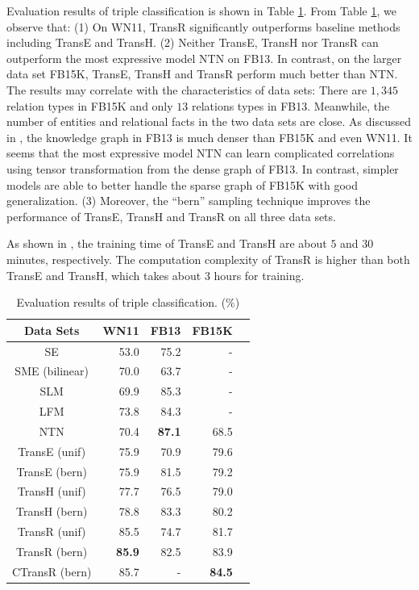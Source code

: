     Evaluation results of triple classification is shown in Table \ref{label:triple_classification}. From Table \ref{label:triple_classification}, we observe that: (1) On WN11, TransR significantly outperforms baseline methods including TransE and TransH. (2) Neither TransE, TransH nor TransR can outperform the most expressive model NTN on FB13. In contrast, on the larger data set FB15K, TransE, TransH and TransR perform much better than NTN. The results may correlate with the characteristics of data sets: There are $1,345$ relation types in FB15K and only $13$ relations types in FB13. Meanwhile, the number of entities and relational facts in the two data sets are close. As discussed in , the knowledge graph in FB13 is much denser than FB15K and even WN11. It seems that the most expressive model NTN can learn complicated correlations using tensor transformation from the dense graph of FB13. In contrast, simpler models are able to better handle the sparse graph of FB15K with good generalization. (3) Moreover, the ``bern'' sampling technique improves the performance of TransE, TransH and TransR on all three data sets.

    As shown in , the training time of TransE and TransH are about $5$ and $30$ minutes, respectively. The computation complexity of TransR is higher than both TransE and TransH, which takes about $3$ hours for training.

    \begin{table}[htb]
    \small
    \centering
    \caption{Evaluation results of triple classification. ($\%$)}
    \label{label:triple_classification}
    \begin{tabular}{|c|r|r|r|r|}
    \hline
    Data Sets & WN11 & FB13 & FB15K \\
    \hline
    SE                   & 53.0 &           75.2  & - \\
    SME (bilinear) & 70.0 &           63.7  & - \\
    SLM                & 69.9 &           85.3  & - \\
    LFM                & 73.8 &           84.3  & - \\
    NTN                & 70.4 &\textbf{87.1} &68.5 \\
    TransE (unif)  & 75.9 &           70.9  & 79.6 \\
    TransE (bern) & 75.9 &           81.5  & 79.2 \\
    TransH (unif)  & 77.7 &           76.5  & 79.0 \\
    TransH (bern) & 78.8 &           83.3  & 80.2 \\ \hline
    TransR (unif)  &85.5  &           74.7  & 81.7 \\
    TransR (bern) &\textbf{85.9}&82.5  & 83.9 \\
    CTransR (bern) & 85.7 & -&\textbf{84.5}\\
    \hline
    \end{tabular}
    \end{table}

